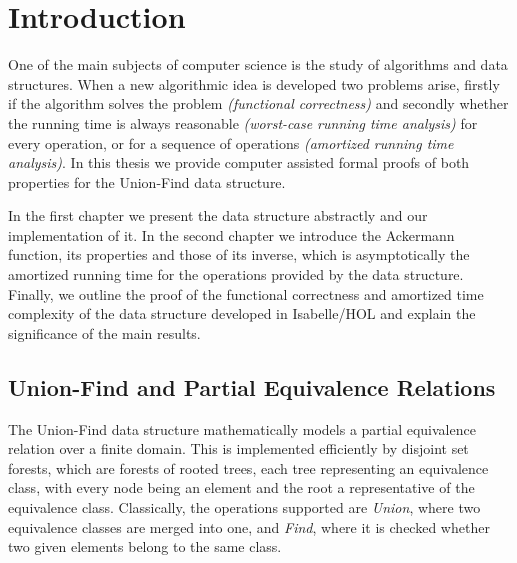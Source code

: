 \documentclass[headsepline,footsepline,footinclude=false,oneside,fontsize=11pt,paper=a4,listof=totoc,bibliography=totoc]{scrbook} %
\begin{document}


\frontmatter{}





\tableofcontents{}

\mainmatter{}

%

\chapter{Introduction}

One of the main subjects of computer science is the study of algorithms and data structures. When a new algorithmic idea is developed two problems arise, firstly if the algorithm solves the problem \textit{(functional correctness)} and secondly whether the running time is always reasonable \textit{(worst-case running time analysis)} for every operation, or for a sequence of operations \textit{(amortized running time analysis)}. In this thesis we provide computer assisted formal proofs of both properties for the Union-Find data structure. 

In the first chapter we present the data structure abstractly and our implementation of it. In the second chapter we introduce the Ackermann function, its properties and those of its inverse, which is asymptotically the amortized running time for the operations provided by the data structure. Finally, we outline the proof of the functional correctness and amortized time complexity of the data structure developed in Isabelle/HOL and explain the significance of the main results.

\section{Union-Find and Partial Equivalence Relations}

The Union-Find data structure mathematically models a partial equivalence relation over a finite domain. This is implemented efficiently by disjoint set forests, which are forests of rooted trees, each tree representing an equivalence class, with every node being an element and the root a representative of the equivalence class.
Classically, the operations supported are \textit{Union}, where two equivalence classes are merged into one, and \textit{Find}, where it is checked whether two given elements belong to the same class.
\end{document}
